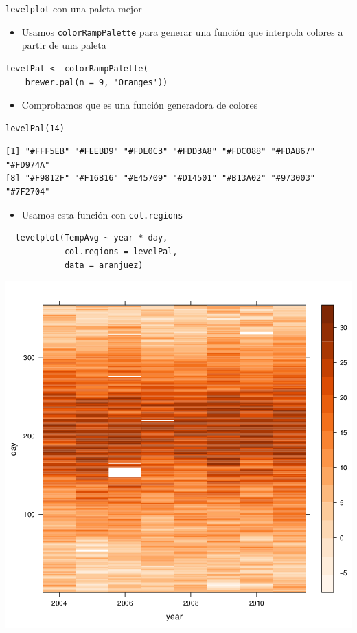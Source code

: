 \documentclass[xcolor={usenames,svgnames,dvipsnames}]{beamer}
\begin{document}
\begin{frame}[fragile,label=sec-3-36]{\texttt{levelplot} con una paleta mejor}
 \begin{itemize}
\item Usamos \texttt{colorRampPalette} para generar una función que interpola colores a partir de una paleta
\end{itemize}
\lstset{language=R,label= ,caption= ,numbers=none}
\begin{lstlisting}
levelPal <- colorRampPalette(
    brewer.pal(n = 9, 'Oranges'))
\end{lstlisting}
\begin{itemize}
\item Comprobamos que es una función generadora de colores
\end{itemize}

\lstset{language=R,label= ,caption= ,numbers=none}
\begin{lstlisting}
levelPal(14)
\end{lstlisting}

\begin{verbatim}
[1] "#FFF5EB" "#FEEBD9" "#FDE0C3" "#FDD3A8" "#FDC088" "#FDAB67" "#FD974A"
[8] "#F9812F" "#F16B16" "#E45709" "#D14501" "#B13A02" "#973003" "#7F2704"
\end{verbatim}

\begin{itemize}
\item Usamos esta función con \texttt{col.regions}
\end{itemize}
\lstset{language=R,label= ,caption= ,numbers=none}
\begin{lstlisting}
  levelplot(TempAvg ~ year * day,
            col.regions = levelPal,
            data = aranjuez)
\end{lstlisting}
\end{frame}

\begin{frame}[label=sec-3-37]{}
\includegraphics[width=.9\linewidth]{figs/levelplotPal.png}
\end{frame}
\end{document}

